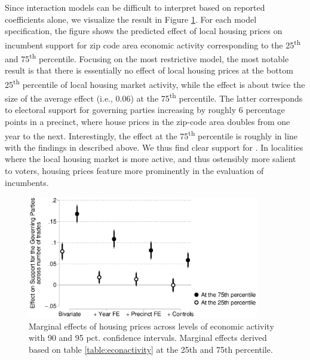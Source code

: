 \documentclass[12pt,a4paper]{article}
\begin{document}
	Since interaction models can be difficult to interpret based on reported coefficients alone, we visualize the result in Figure \ref{localactivity}. For each model specification, the figure shows the predicted effect of local housing prices on incumbent support for zip code area economic activity corresponding to the 25\textsuperscript{th} and 75\textsuperscript{th} percentile. Focusing on the most restrictive model, the most notable result is that there is essentially no effect of local housing prices at the bottom 25\textsuperscript{th} percentile of local housing market activity, while the effect is about twice the size of the average effect  (i.e., 0.06) at the 75\textsuperscript{th} percentile. The latter corresponds to electoral support for governing parties increasing by roughly 6 percentage points in a precinct, where house prices in the zip-code area doubles from one year to the next. Interestingly, the effect at the 75\textsuperscript{th} percentile is roughly in line with the findings in \citep{healy2017presidential} described above. We thus find clear support for \htwo. In localities where the local housing market is more active, and thus ostensibly more salient to voters, housing prices feature more prominently in the evaluation of incumbents. 
	
	
	
	\begin{figure}[htbp!]
		\includegraphics[width=0.9\textwidth]{../figures/localactivity.eps}
		\centering
		\caption{Marginal effects of housing prices across levels of economic activity with 90 and 95 pct. confidence intervals.  Marginal effects derived based on table \ref{table:econactivity} at the 25th and 75th percentile.}\label{localactivity}
	\end{figure}
	
\end{document}
